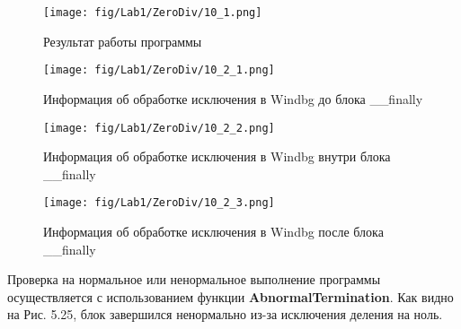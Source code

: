 \begin{figure}[H]
    \begin{center}
        \texttt{[image: fig/Lab1/ZeroDiv/10\_1.png]}
        \caption{Результат работы программы}
        \label{pic:10_1}
    \end{center}
\end{figure}

\begin{figure}[H]
    \begin{center}
        \texttt{[image: fig/Lab1/ZeroDiv/10\_2\_1.png]}
        \caption{Информация об обработке исключения в Windbg до блока \_\_finally}
        \label{pic:10_2_1}
    \end{center}
\end{figure}

\begin{figure}[H]
    \begin{center}
        \texttt{[image: fig/Lab1/ZeroDiv/10\_2\_2.png]}
        \caption{Информация об обработке исключения в Windbg внутри блока \_\_finally}
        \label{pic:10_2_2}
    \end{center}
\end{figure}

\begin{figure}[H]
    \begin{center}
        \texttt{[image: fig/Lab1/ZeroDiv/10\_2\_3.png]}
        \caption{Информация об обработке исключения в Windbg после блока \_\_finally}
        \label{pic:10_2_3}
    \end{center}
\end{figure}

Проверка на нормальное или ненормальное выполнение программы осуществляется с использованием функции \textbf{AbnormalTermination}. Как видно на Рис. 5.25, блок завершился ненормально из-за исключения деления на ноль.
